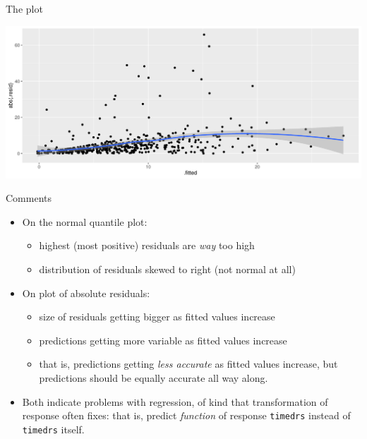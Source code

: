 \documentclass[
  ignorenonframetext,
]{beamer}
\begin{document}
\begin{frame}{The plot}
\protect\hypertarget{the-plot}{}

\includegraphics{slides_d29_files/figure-beamer/unnamed-chunk-60-1.pdf}

\end{frame}

\begin{frame}[fragile]{Comments}
\protect\hypertarget{comments-4}{}

\begin{itemize}
\item
  On the normal quantile plot:

  \begin{itemize}
  \item
    highest (most positive) residuals are \emph{way} too high
  \item
    distribution of residuals skewed to right (not normal at all)
  \end{itemize}
\item
  On plot of absolute residuals:

  \begin{itemize}
  \item
    size of residuals getting bigger as fitted values increase
  \item
    predictions getting more variable as fitted values increase
  \item
    that is, predictions getting \emph{less accurate} as fitted values
    increase, but predictions should be equally accurate all way along.
  \end{itemize}
\item
  Both indicate problems with regression, of kind that transformation of
  response often fixes: that is, predict \emph{function} of response
  \texttt{timedrs} instead of \texttt{timedrs} itself.
\end{itemize}

\end{frame}
\end{document}
